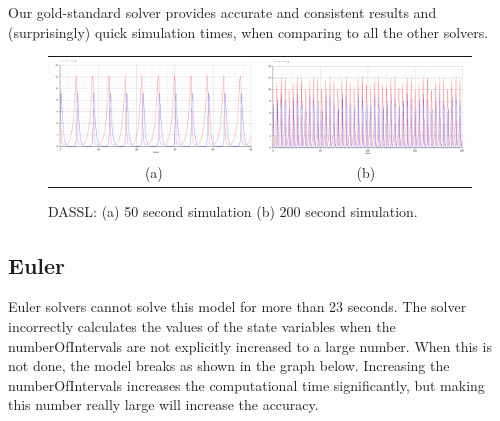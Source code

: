 \documentclass[10pt]{article}
\begin{document}
Our gold-standard solver provides accurate and consistent results and (surprisingly) quick simulation times, when comparing to all the other solvers.
\begin{figure}[htbp]
\begin{center}
\begin{tabular}{cc}
		\includegraphics[scale=0.18]{Selection_056.png}	&		\includegraphics[scale=0.18]{Selection_057.png}\\
		\footnotesize(a)	&	\footnotesize(b)\\

	\end{tabular}
\end{center}
\vspace{-0.5cm}

\caption{DASSL: (a) 50 second simulation (b) 200 second simulation.}
\end{figure}




\subsection{Euler}

Euler solvers cannot solve this model for more than 23 seconds. The solver incorrectly calculates the values of the state variables when the numberOfIntervals are not explicitly increased to a large number. When this is not done, the model breaks as shown in the graph below. Increasing the numberOfIntervals increases the computational time significantly, but making this number really large will increase the accuracy.
\end{document}
